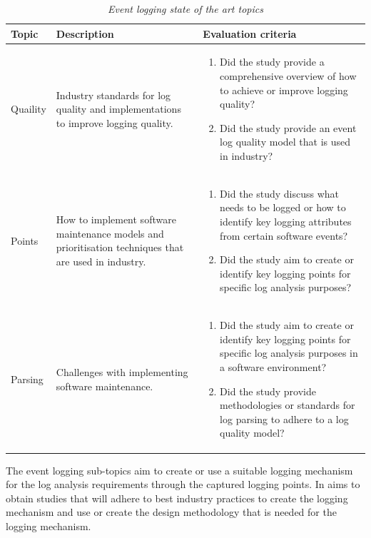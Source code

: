 \begin{table}[!htb]
	\centering
	\caption[Event logging state of the art topics]
	{\textit{Event logging state of the art topics}}
	\label{tbl:ch1_soaEventLogging}
	\begin{tabularx}{\linewidth}{|l|X|X|}
		\hline \textbf{Topic}  & \textbf{Description} & \textbf{Evaluation criteria}\\
		\hline Quaility & \RaggedRight Industry standards for log quality and implementations to improve logging quality.& \RaggedRight \begin{enumerate}
			\item Did the study provide a comprehensive overview of how to achieve or improve logging quality?
			\item Did the study provide an event log quality model that is used in industry?
		\end{enumerate} \\
		\hline Points & How to implement software maintenance models and prioritisation techniques that are used in industry. & \RaggedRight \begin{enumerate}
			\item Did the study discuss what needs to be logged or how to identify key logging attributes from certain software events?
			\item Did the study aim to create or identify key logging points for specific log analysis purposes?
		\end{enumerate} \\
		\hline Parsing & Challenges with implementing software maintenance. & \RaggedRight \begin{enumerate}
			\item Did the study aim to create or identify key logging points for specific log analysis purposes in a software environment?
			\item Did the study provide methodologies or standards for log parsing to adhere to a log quality model?
		\end{enumerate}\\	
		\hline
	\end{tabularx}
\end{table}

The event logging sub-topics aim to create or use a suitable logging mechanism for the log analysis requirements through the captured logging points. In  aims to obtain studies that will adhere to best industry practices to create the logging mechanism and use or create the design methodology that is needed for the logging mechanism.

